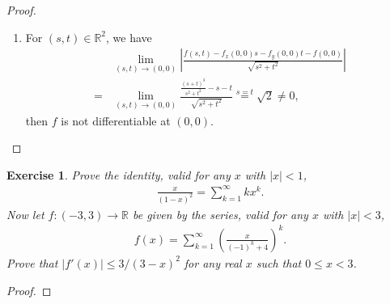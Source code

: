 \documentclass[11pt]{article}
\newtheorem{exercise}{Exercise}[section]
\theoremstyle{definition}
\numberwithin{equation}{subsection}
\begin{document}
\begin{proof}
\begin{enumerate}[label=(\alph*)]
    \item For $(s,t) \in \mathbb{R}^2$, we have
    \begin{align*}
        & \lim_{(s,t) \to (0,0)} \left|\frac{f(s,t) - f_x(0,0)s - f_y(0,0)t - f(0,0)}{\sqrt{s^2 + t^2}} \right| \\
        = & \lim_{(s,t) \to (0,0)} \frac{\frac{(s+t)^3}{s^2+t^2} - s - t}{\sqrt{s^2 + t^2}} \overset{s=t}{=} \sqrt{2} \neq 0,
    \end{align*}
    then $f$ is not differentiable at $(0,0)$.
\end{enumerate}
\end{proof}

\medskip

\begin{exercise}
Prove the identity, valid for any $x$ with $\left|x\right| < 1$,
\begin{align*}
    \frac{x}{(1 - x)^2} = \sum^\infty_{k = 1}kx^k.
\end{align*}
Now let $f: (-3, 3) \to \mathbb{R}$ be given by the series, valid for any $x$ with $\left|x\right| < 3$,
\begin{align*}
    f(x) = \sum^{\infty}_{k=1} \left( \frac{x}{(-1)^k + 4} \right)^k.
\end{align*}
Prove that $\left|f'(x)\right| \leq 3/(3 - x)^2$ for any real $x$ such that $0 \leq x < 3$.
\end{exercise}
\begin{proof}

\end{proof}















\newpage


\end{document}
